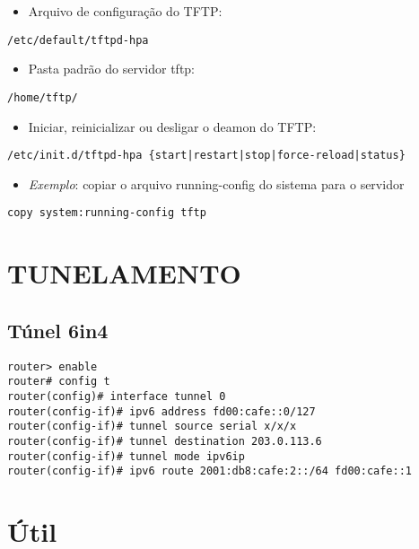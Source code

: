 \documentclass[]{article}
\providecommand{\tightlist}{%
  \setlength{\itemsep}{0pt}\setlength{\parskip}{0pt}}
\begin{document}
\begin{itemize}
\tightlist
\item
  Arquivo de configuração do TFTP:
\end{itemize}

\texttt{/etc/default/tftpd-hpa}

\begin{itemize}
\tightlist
\item
  Pasta padrão do servidor tftp:
\end{itemize}

\texttt{/home/tftp/}

\begin{itemize}
\tightlist
\item
  Iniciar, reinicializar ou desligar o deamon do TFTP:
\end{itemize}

\begin{verbatim}
/etc/init.d/tftpd-hpa {start|restart|stop|force-reload|status}
\end{verbatim}

\begin{itemize}
\tightlist
\item
  \emph{Exemplo}: copiar o arquivo running-config do sistema para o
  servidor
\end{itemize}

\begin{verbatim}
copy system:running-config tftp
\end{verbatim}

\hypertarget{tunelamento}{%
\section{TUNELAMENTO}\label{tunelamento}}

\hypertarget{tuxfanel-6in4}{%
\subsection{Túnel 6in4}\label{tuxfanel-6in4}}

\begin{verbatim}
router> enable
router# config t
router(config)# interface tunnel 0
router(config-if)# ipv6 address fd00:cafe::0/127
router(config-if)# tunnel source serial x/x/x
router(config-if)# tunnel destination 203.0.113.6
router(config-if)# tunnel mode ipv6ip
router(config-if)# ipv6 route 2001:db8:cafe:2::/64 fd00:cafe::1
\end{verbatim}

\hypertarget{uxfatil}{%
\section{Útil}\label{uxfatil}}
\end{document}
